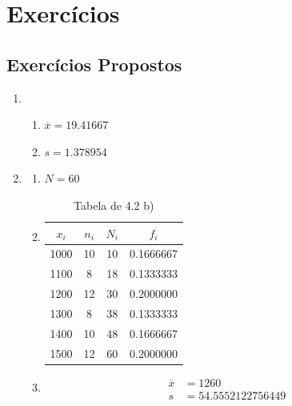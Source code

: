 \documentclass[11pt,a4paper]{report}
\begin{document}
\clearpage



\chapter{Exercícios}
\section*{Exercícios Propostos}

\begin{enumerate}[label=\arabic{chapter}.\arabic*]
	\item {}\hfill \\
		
		\begin{enumerate}[label=\alph*)]
		\item $\overline{x} = 19.41667$\hfill
		\item $s = 1.378954$\hfill
		\end{enumerate}
	\item {}\hfill
		\begin{enumerate}[label=\alph*)]
		\item $N = 60$\hfill
			
		\item \hfill
			\begin{table}[h!]
				\centering
				\begin{tabular}{|c|c|c|c|}
					\hline
					$x_i$&$n_i$&$N_i$&$f_i$ \\
					\hline
					1000&10&10&0.1666667\\
					\hline
					1100& 8&18&0.1333333\\
					\hline
					1200&12&30&0.2000000\\
					\hline
					1300& 8&38&0.1333333\\
					\hline
					1400&10&48&0.1666667\\
					\hline
					1500&12&60&0.2000000\\
					\hline
				\end{tabular}
				\caption{Tabela de 4.2 b)}
			\end{table}
			
			\clearpage
		\item \hfill
			\begin{align*}
				\overline{x} &= 1260 \\
				s &= 54.5552122756449

\end{align*}
\end{enumerate}
\end{enumerate}
\end{document}
